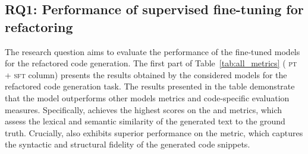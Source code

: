 
\noindent
\subsection{RQ1: Performance of supervised fine-tuning for refactoring}

The research question aims to evaluate the performance of the fine-tuned models
for the refactored code generation.
The first part of Table~\ref{tab:all_metrics}
(\ie{} \textsc{pt + sft} column)
presents the results obtained by the considered models for the refactored code generation task. 
The results presented in the table demonstrate that the \plbart{} model outperforms other models metrics and code-specific evaluation measures. Specifically, \plbart{} achieves the highest scores on the \bleu{} and \rouge{} metrics, which assess the lexical and semantic similarity of the generated text to the ground truth. Crucially, \plbart{} also exhibits superior performance on the \codebleu{} metric, which captures the syntactic and structural fidelity of the generated code snippets.

